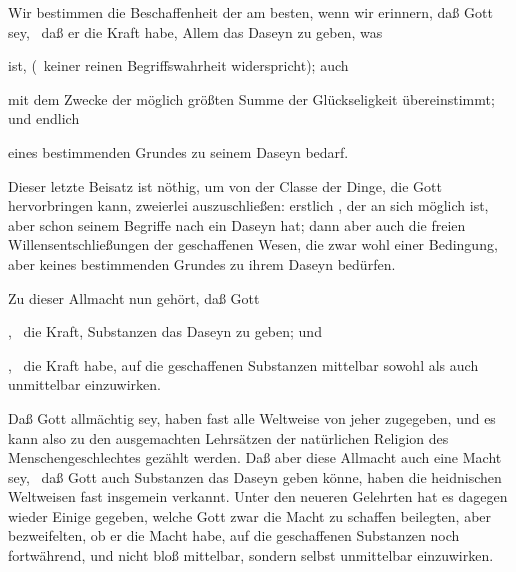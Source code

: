 \begin{aufza}
\item Wir bestimmen die Beschaffenheit der  am besten, wenn wir erinnern, daß Gott  sey, \dh\ daß er die Kraft habe, Allem das Daseyn zu geben, was 
\begin{inparaenum}[a)] 
\item {} ist, (\dh\ keiner reinen Begriffswahrheit widerspricht); auch 
\item mit dem Zwecke der möglich größten Summe der Glückseligkeit übereinstimmt; und endlich 
\item eines bestimmenden Grundes zu seinem Daseyn bedarf.
\end{inparaenum}
\begin{RWanm}
Dieser letzte Beisatz ist nöthig, um von der Classe der Dinge, die Gott hervorbringen kann, zweierlei auszuschließen: erstlich , der an sich möglich ist, aber schon seinem Begriffe nach ein  Daseyn hat; dann aber auch die freien Willensentschließungen der geschaffenen Wesen, die zwar wohl einer Bedingung, aber keines bestimmenden Grundes zu ihrem Daseyn bedürfen.
\end{RWanm}
\item Zu dieser Allmacht nun gehört, daß Gott
\begin{aufzb}
\item {}, \dh\ die Kraft, Substanzen das Daseyn zu geben; und
\item {}, \dh\ die Kraft habe, auf die geschaffenen Substanzen mittelbar sowohl als auch unmittelbar einzuwirken.
\end{aufzb}
\item Daß Gott allmächtig sey, haben fast alle Weltweise von jeher zugegeben, und es kann also zu den ausgemachten Lehrsätzen der natürlichen Religion des Menschengeschlechtes gezählt werden. Daß aber diese Allmacht auch eine  Macht sey, \dh\ daß Gott auch Substanzen das Daseyn geben könne, haben die heidnischen Weltweisen fast insgemein verkannt. Unter den neueren Gelehrten hat es dagegen wieder Einige gegeben, welche Gott zwar die Macht zu schaffen beilegten, aber bezweifelten, ob er die Macht habe, auf die geschaffenen Substanzen noch fortwährend, und nicht bloß mittelbar, sondern selbst unmittelbar einzuwirken. 

\end{aufza}

